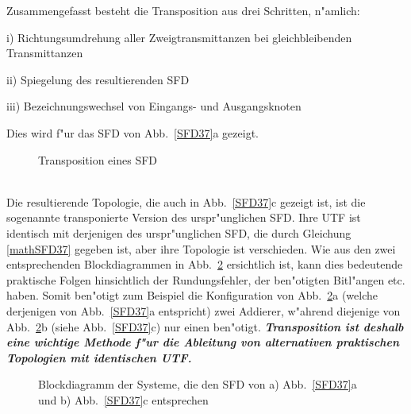 Zusammengefasst besteht die Transposition aus drei Schritten,
n"amlich:
\begin{description}
\item i) Richtungsumdrehung aller Zweigtransmittanzen bei gleichbleibenden Transmittanzen
\item ii) Spiegelung des resultierenden SFD
\item iii) Bezeichnungswechsel von Eingangs- und Ausgangsknoten
\end{description}
\nit Dies wird f"ur das SFD von Abb.~\ref{SFD37}a gezeigt.
\begin{figure}[htb!]
\begin{center}
  \hspace*{1mm}\caption{Transposition eines SFD}\label{SFD38}
\end{center}\vspace*{-7mm}
\end{figure}\\
\nit Die resultierende Topologie, die auch in
Abb.~\ref{SFD37}c gezeigt ist, ist die sogenannte transponierte
Version des urspr"unglichen SFD.  Ihre UTF ist
identisch mit derjenigen des urspr"unglichen SFD, die durch Gleichung
\ref{mathSFD37} gegeben ist, aber ihre Topologie ist verschieden. Wie
aus den zwei entsprechenden Blockdiagrammen in Abb.~\ref{SFD39}
ersichtlich ist, kann dies bedeutende praktische Folgen hinsichtlich
der Rundungsfehler, der ben"otigten
Bitl"angen etc.  haben. Somit ben"otigt zum Beispiel
die Konfiguration von Abb.~\ref{SFD39}a (welche derjenigen von
Abb.~\ref{SFD37}a entspricht) zwei Addierer, w"ahrend diejenige von
Abb.~\ref{SFD39}b (siehe Abb.~\ref{SFD37}c) nur einen ben"otigt.
{\it\textbf{Transposition ist deshalb eine wichtige Methode f"ur die Ableitung von
alternativen praktischen Topologien mit identischen
UTF.}}\\
\begin{figure}[htb!]
\vspace*{-6mm}\begin{center}
  \caption{Blockdiagramm der Systeme,
die den SFD von a) Abb.~\ref{SFD37}a und b) Abb.~\ref{SFD37}c entsprechen}\label{SFD39}
\end{center}\vspace*{-7mm}
\end{figure}
